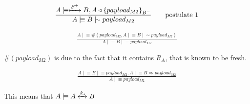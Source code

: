 \documentclass[a4paper,12pt]{article}
\newcommand{\believes}{\mid\!\equiv}
\newcommand{\sees}{\triangleleft}
\newcommand{\oncesaid}{\mid\!\sim}
\newcommand{\controls}{\Rightarrow}
\newcommand{\fresh}[1]{\#(#1)}
\newcommand{\encrypt}[2]{{ \{ #1 \} }_{#2}}
\newcommand{\sharekey}[1]{\xleftrightarrow{#1}}
\newcommand{\pubkey}[1]{\xmapsto{#1}}
\begin{document}
\begin{align}
\frac{A \believes \pubkey{B^+} B, A \sees \encrypt{payload_{M2}}{B^-}}{A \believes B \oncesaid payload_{M2}} \tag*{postulate 1}
\end{align}

\begin{align}
\frac{A \believes \fresh{payload_{M2}, A \believes B \oncesaid payload_{M2}}}{A \believes B \believes payload_{M2}} \tag*{postulate 2}
\end{align}

$\fresh{payload_{M2}}$ is due to the fact that it contains $R_A$, that is known to be fresh.

\begin{align}
\frac{A \believes B \believes payload_{M2}, A \believes B \controls payload_{M2}}{A \believes payload_{M2}} \tag*{postulate 3}
\end{align}

This means that $A \believes A \sharekey{k_s} B$
\end{document}

